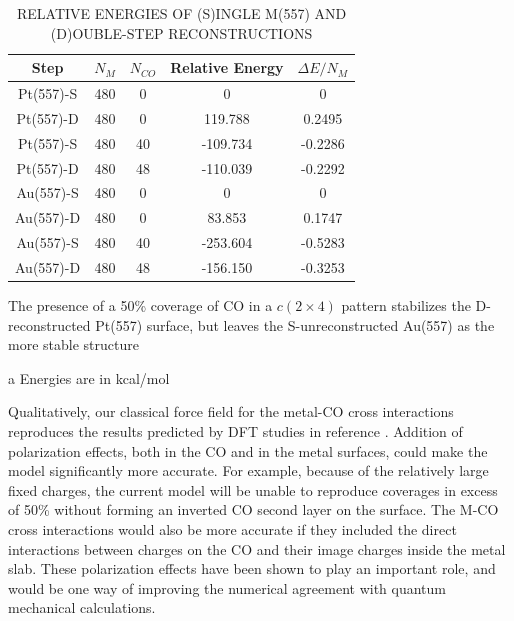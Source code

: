 \begin{table}
\caption{RELATIVE ENERGIES OF (S)INGLE M(557) AND (D)OUBLE-STEP RECONSTRUCTIONS}
\centering
\begin{threeparttable}
\centering
\begin{tabular}{  c   c   c   c   c  }
\hline \hline
Step & $N_{M}$ & $N_{CO}$ & Relative Energy & $\Delta E / N_{M}$ \\
\hline
Pt(557)-S & 480 & 0  &  0 & 0 \\
Pt(557)-D & 480 & 0  &  119.788 & 0.2495 \\
Pt(557)-S & 480 & 40 &  -109.734 & -0.2286 \\
Pt(557)-D & 480 & 48 &  -110.039 & -0.2292 \\
\hline
Au(557)-S & 480 & 0  &  0 & 0  \\
Au(557)-D & 480 & 0  &  83.853 & 0.1747 \\
Au(557)-S & 480 & 40 &  -253.604 & -0.5283 \\
Au(557)-D & 480 & 48 &  -156.150 & -0.3253 \\
\hline \hline
\end{tabular}
\begin{tablenotes}
  \item The presence of a 50\% coverage of CO in a $c(2\times 4)$ pattern stabilizes the D-reconstructed Pt(557) surface, but leaves the S-unreconstructed Au(557) as the more stable structure
  \item[a] Energies are in kcal/mol
\end{tablenotes}
\end{threeparttable}
\label{tab:steps}
\end{table}

Qualitatively, our classical force field for the metal-CO cross
interactions reproduces the results predicted by DFT studies in
reference \citep{Tao:2010aa}. Addition
of polarization effects, both in the CO and in the metal surfaces,
could make the model significantly more accurate.  For example,
because of the relatively large fixed charges, the current model will
be unable to reproduce coverages in excess of 50\% without forming an
inverted CO second layer on the surface.  The M-CO cross interactions
would also be more accurate if they included the direct interactions
between charges on the CO and their image charges inside the metal
slab. These polarization effects have been shown to play an important
role,\citep{Deshlahra:2012aa} and would be one way of improving the
numerical agreement with quantum mechanical calculations.

